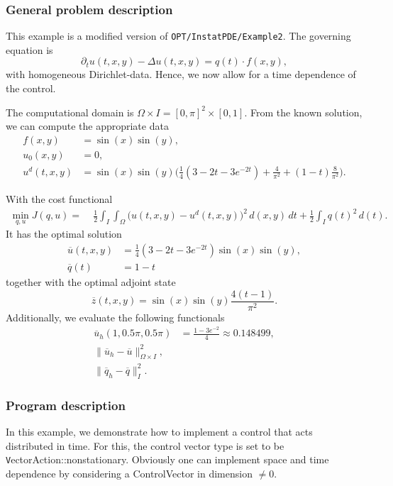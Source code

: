 \subsubsection{General problem description}

This example is a modified version of \texttt{OPT/InstatPDE/Example2}. 
The governing equation is
\begin{equation*}
\partial_t u(t,x,y) - \Delta u(t,x,y) = q(t)\cdot f(x,y),
\end{equation*}
with homogeneous Dirichlet-data. Hence, we now allow for a time dependence of the control. 

The computational domain is $\Omega \times I = [0,\pi]^2 \times [0,1]$. From the known solution, we can compute the appropriate data 
\begin{align*}
f(x,y) &= \sin(x)\sin(y),\\
u_0(x,y) &= 0,\\
u^d(t,x,y)&= \sin(x)\sin(y) \bigl(\tfrac{1}{4}(3-2t-3e^{-2t}) + \tfrac{4}{\pi^2} + (1-t)\tfrac{8}{\pi^2}\bigr).
\end{align*}

With the cost functional 
\begin{align*}
 \min_{q,u} J(q,u) =&\; \frac{1}{2}\int_I\int_{\Omega} \bigl(u(t,x,y) - u^d(t,x,y)\bigr)^2\,d(x,y)\,dt + \frac{1}{2} \int_{I} q(t)^2\,d(t).
\end{align*}
It has the optimal solution 
\begin{align*}
\overline{u}(t,x,y) &= \tfrac{1}{4}(3-2t-3e^{-2t})\sin(x) \sin(y),\\
\overline{q}(t) &= 1-t 
\end{align*}
together with the optimal adjoint state 
\[
 \overline{z}(t,x,y) = \sin(x) \sin(y) \frac{4(t-1)}{\pi^2}.
\]
Additionally, we evaluate the following functionals
\begin{align*}
  \overline{u}_h(1,0.5\pi,0.5\pi) &= \frac{1-3e^{-2}}{4} \approx 0.148499,\\
  \| \overline{u}_h - \overline{u}\|^2_{\Omega \times I},& \\
  \| \overline{q}_h - \overline{q}\|^2_I. &  
\end{align*}

\subsubsection{Program description}
In this example, we demonstrate how to implement a control that acts distributed in time. 
For this, the control vector type is set to be 
{\texttt VectorAction::nonstationary}. 
Obviously one can implement space and time dependence by considering a ControlVector in
dimension $\ne 0$.

